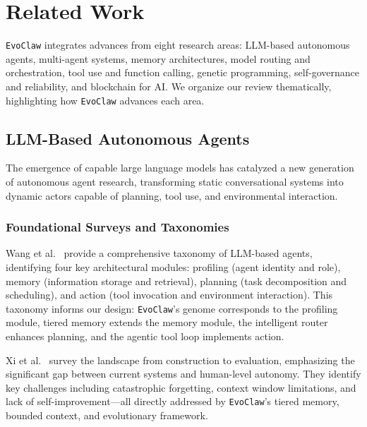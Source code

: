 \documentclass{article}
\newcommand{\evoclaw}{\texttt{EvoClaw}\xspace}
\begin{document}

\section{Related Work}
\label{sec:related}

\evoclaw{} integrates advances from eight research areas: LLM-based autonomous agents, multi-agent systems, memory architectures, model routing and orchestration, tool use and function calling, genetic programming, self-governance and reliability, and blockchain for AI. We organize our review thematically, highlighting how \evoclaw{} advances each area.

\subsection{LLM-Based Autonomous Agents}

The emergence of capable large language models has catalyzed a new generation of autonomous agent research, transforming static conversational systems into dynamic actors capable of planning, tool use, and environmental interaction.

\subsubsection{Foundational Surveys and Taxonomies}

Wang et al.~\cite{wang2023survey} provide a comprehensive taxonomy of LLM-based agents, identifying four key architectural modules: profiling (agent identity and role), memory (information storage and retrieval), planning (task decomposition and scheduling), and action (tool invocation and environment interaction). This taxonomy informs our design: \evoclaw{}'s genome corresponds to the profiling module, tiered memory extends the memory module, the intelligent router enhances planning, and the agentic tool loop implements action.

Xi et al.~\cite{xi2023rise} survey the landscape from construction to evaluation, emphasizing the significant gap between current systems and human-level autonomy. They identify key challenges including catastrophic forgetting, context window limitations, and lack of self-improvement—all directly addressed by \evoclaw{}'s tiered memory, bounded context, and evolutionary framework.
\end{document}
